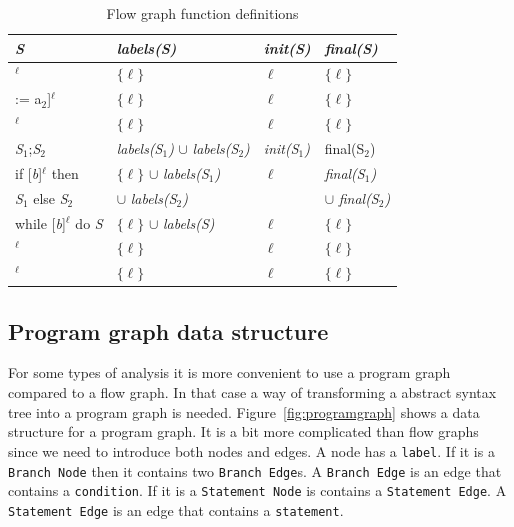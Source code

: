 \begin{table}
\begin{tabular}{ l | l | l | l }
\textsl{S}                              & \textsl{labels(S)}                                    & \textsl{init(S)}     & \textsl{final(S)} \\ 
\hline
[x := a]$^\ell$                         & $\{\ell\}$                                            &$\ell$                & $\{\ell\}$ \\
\hline
[int A[a$_1$] := a$_2$]$^\ell$          & $\{\ell\}$                                            &$\ell$                & $\{\ell\}$ \\
\hline
[skip]$^\ell$                           & $\{\ell\}$                                            &$\ell$                & $\{\ell\}$ \\
\hline
\textsl{S}$_1$;\textsl{S}$_2$           & \textsl{labels(S$_1$)} $\cup$ \textsl{labels(S$_2$)}  & \textsl{init(S$_1$)} & {final(S$_2$)} \\ %
\hline
if [\textsl{b}]$^\ell$ then             & $\{\ell\}$ $\cup$  \textsl{labels(S$_1$)}             &$\ell$                & \textsl{final(S$_1$)} \\
  \textsl{S}$_1$ else \textsl{S}$_2$    &  $\cup$ \textsl{labels(S$_2$)}                        &                      & $\cup$ \textsl{final(S$_2$)} \\
\hline
while [\textsl{b}]$^\ell$ do \textsl{S} & $\{\ell\}$ $\cup$  \textsl{labels(S)}                 &$\ell$                & $\{\ell\}$ \\
\hline
[read \textsl{x}]$^\ell$                & $\{\ell\}$                                            &$\ell$                & $\{\ell\}$ \\
\hline
[write \textsl{x}]$^\ell$               & $\{\ell\}$                                            &$\ell$                & $\{\ell\}$ \\
\end{tabular}
\centering
\caption{Flow graph function definitions}
\label{table:flow_graph_functions}
\end{table}

\subsection{Program graph data structure}
For some types of analysis it is more convenient to use a program graph compared to a flow graph. In that case a way of transforming a abstract syntax tree into a program graph is needed. Figure~\ref{fig:programgraph} shows a data structure for a program graph. It is a bit more complicated than flow graphs since we need to introduce both nodes and edges. A node has a \texttt{label}. If it is a \texttt{Branch Node} then it contains two \texttt{Branch Edge}s. A \texttt{Branch Edge} is an edge that contains a \texttt{condition}. If it is a \texttt{Statement Node} is contains a \texttt{Statement Edge}. A \texttt{Statement Edge} is an edge that contains a \texttt{statement}.

